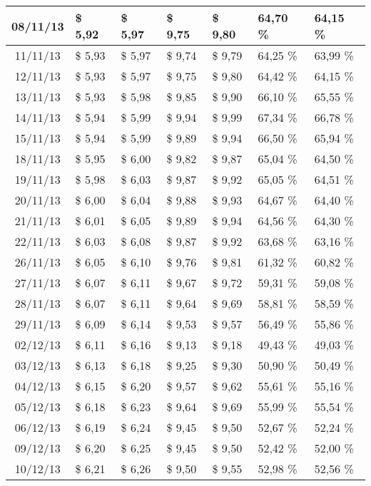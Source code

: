 \begin{center}
\begin{longtable}{|c|p{1.5cm}|p{1.5cm}|p{1.5cm}|p{1.5cm}|p{1.5cm}|p{1.5cm}|}
08/11/13 & \$ 5,92 & \$ 5,97 & \$ 9,75 & \$ 9,80 & 64,70 \% & 64,15 \% \\ \hline
11/11/13 & \$ 5,93 & \$ 5,97 & \$ 9,74 & \$ 9,79 & 64,25 \% & 63,99 \% \\ \hline
12/11/13 & \$ 5,93 & \$ 5,97 & \$ 9,75 & \$ 9,80 & 64,42 \% & 64,15 \% \\ \hline
13/11/13 & \$ 5,93 & \$ 5,98 & \$ 9,85 & \$ 9,90 & 66,10 \% & 65,55 \% \\ \hline
14/11/13 & \$ 5,94 & \$ 5,99 & \$ 9,94 & \$ 9,99 & 67,34 \% & 66,78 \% \\ \hline
15/11/13 & \$ 5,94 & \$ 5,99 & \$ 9,89 & \$ 9,94 & 66,50 \% & 65,94 \% \\ \hline
18/11/13 & \$ 5,95 & \$ 6,00 & \$ 9,82 & \$ 9,87 & 65,04 \% & 64,50 \% \\ \hline
19/11/13 & \$ 5,98 & \$ 6,03 & \$ 9,87 & \$ 9,92 & 65,05 \% & 64,51 \% \\ \hline
20/11/13 & \$ 6,00 & \$ 6,04 & \$ 9,88 & \$ 9,93 & 64,67 \% & 64,40 \% \\ \hline
21/11/13 & \$ 6,01 & \$ 6,05 & \$ 9,89 & \$ 9,94 & 64,56 \% & 64,30 \% \\ \hline
22/11/13 & \$ 6,03 & \$ 6,08 & \$ 9,87 & \$ 9,92 & 63,68 \% & 63,16 \% \\ \hline
26/11/13 & \$ 6,05 & \$ 6,10 & \$ 9,76 & \$ 9,81 & 61,32 \% & 60,82 \% \\ \hline
27/11/13 & \$ 6,07 & \$ 6,11 & \$ 9,67 & \$ 9,72 & 59,31 \% & 59,08 \% \\ \hline
28/11/13 & \$ 6,07 & \$ 6,11 & \$ 9,64 & \$ 9,69 & 58,81 \% & 58,59 \% \\ \hline
29/11/13 & \$ 6,09 & \$ 6,14 & \$ 9,53 & \$ 9,57 & 56,49 \% & 55,86 \% \\ \hline
02/12/13 & \$ 6,11 & \$ 6,16 & \$ 9,13 & \$ 9,18 & 49,43 \% & 49,03 \% \\ \hline
03/12/13 & \$ 6,13 & \$ 6,18 & \$ 9,25 & \$ 9,30 & 50,90 \% & 50,49 \% \\ \hline
04/12/13 & \$ 6,15 & \$ 6,20 & \$ 9,57 & \$ 9,62 & 55,61 \% & 55,16 \% \\ \hline
05/12/13 & \$ 6,18 & \$ 6,23 & \$ 9,64 & \$ 9,69 & 55,99 \% & 55,54 \% \\ \hline
06/12/13 & \$ 6,19 & \$ 6,24 & \$ 9,45 & \$ 9,50 & 52,67 \% & 52,24 \% \\ \hline
09/12/13 & \$ 6,20 & \$ 6,25 & \$ 9,45 & \$ 9,50 & 52,42 \% & 52,00 \% \\ \hline
10/12/13 & \$ 6,21 & \$ 6,26 & \$ 9,50 & \$ 9,55 & 52,98 \% & 52,56 \% \\ \hline

\end{longtable}
\end{center}
